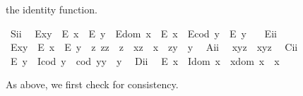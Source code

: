 \begin{isabellebody}
\begin{isamarkuptext}
the identity function.%
\end{isamarkuptext}\isamarkuptrue%
\ S\isactrlsub i\isactrlsub i{\isacharcolon}\ %
\ {\isachardoublequoteopen}{\isacharparenleft}E{\isacharparenleft}x{\isasymcdot}y{\isacharparenright}\ \isactrlbold {\isasymrightarrow}\ {\isacharparenleft}E\ x\ \isactrlbold {\isasymand}\ E\ y{\isacharparenright}{\isacharparenright}\ \isactrlbold {\isasymand}\ {\isacharparenleft}E{\isacharparenleft}dom\ x{\isacharparenright}\ \isactrlbold {\isasymrightarrow}\ E\ x{\isacharparenright}\ \isactrlbold {\isasymand}\ {\isacharparenleft}E{\isacharparenleft}cod\ y{\isacharparenright}\ \isactrlbold {\isasymrightarrow}\ E\ y{\isacharparenright}{\isachardoublequoteclose}\ \ \isanewline
\ E\isactrlsub i\isactrlsub i{\isacharcolon}\ %
\ {\isachardoublequoteopen}E{\isacharparenleft}x{\isasymcdot}y{\isacharparenright}\ \isactrlbold {\isasymleftarrow}\ {\isacharparenleft}E\ x\ \isactrlbold {\isasymand}\ E\ y\ \isactrlbold {\isasymand}\ {\isacharparenleft}\isactrlbold {\isasymexists}z{\isachardot}\ z{\isasymcdot}z\ {\isasymcong}\ z\ \isactrlbold {\isasymand}\ x{\isasymcdot}z\ {\isasymcong}\ x\ \isactrlbold {\isasymand}\ z{\isasymcdot}y\ {\isasymcong}\ y{\isacharparenright}{\isacharparenright}{\isachardoublequoteclose}\ \isanewline
\ A\isactrlsub i\isactrlsub i{\isacharcolon}\ %
\ {\isachardoublequoteopen}x{\isasymcdot}{\isacharparenleft}y{\isasymcdot}z{\isacharparenright}\ {\isasymcong}\ {\isacharparenleft}x{\isasymcdot}y{\isacharparenright}{\isasymcdot}z{\isachardoublequoteclose}\ \isanewline
\ C\isactrlsub i\isactrlsub i{\isacharcolon}\ %
\ {\isachardoublequoteopen}E\ y\ \isactrlbold {\isasymrightarrow}\ {\isacharparenleft}I{\isacharparenleft}cod\ y{\isacharparenright}\ \isactrlbold {\isasymand}\ {\isacharparenleft}cod\ y{\isacharparenright}{\isasymcdot}y\ {\isasymcong}\ y{\isacharparenright}{\isachardoublequoteclose}\ \isanewline
\ D\isactrlsub i\isactrlsub i{\isacharcolon}\ %
\ {\isachardoublequoteopen}E\ x\ \isactrlbold {\isasymrightarrow}\ {\isacharparenleft}I{\isacharparenleft}dom\ x{\isacharparenright}\ \isactrlbold {\isasymand}\ x{\isasymcdot}{\isacharparenleft}dom\ x{\isacharparenright}\ {\isasymcong}\ x{\isacharparenright}{\isachardoublequoteclose}%
\begin{isamarkuptext}%
As above, we first check for consistency.%

\end{isamarkuptext}
\end{isabellebody}
